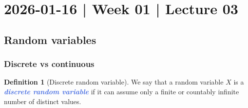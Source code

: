 \documentclass[10pt]{article}
\theoremstyle{definition}
\newtheorem{definition}[theorem]{Definition}
\newcommand{\1}[1]{\textbf{1}_{\left[#1\right]}} %
\def\R{\mathbb{R}} %
\def\P{\mathbb{P}} %
\newcommand{\demph}[1]{\textcolor{RoyalBlue}{\textbf{\slshape #1}}} %
\begin{document}

\newpage

\section{2026-01-16 | Week 01 | Lecture 03}

\subsection{Random variables}
\subsubsection{Discrete vs continuous}
\begin{definition}[Discrete random variable]
  \label{def:discrete-random-variable}
  We say that a random variable $X$ is a \demph{discrete random variable} if
  it can assume only a finite or countably infinite number of distinct values.
\end{definition}
\end{document}

